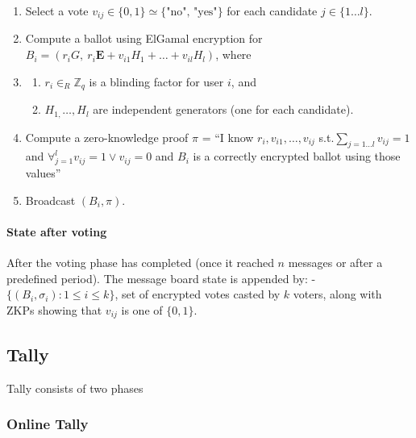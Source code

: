 \documentclass{article}
\begin{document}
\begin{enumerate}
    \item Select a vote $v_{ij} \in \{0,1\} \simeq \{\textrm{"no", "yes"}\}$ for each candidate $j \in \{1 \dots l\}$.
    \item Compute a ballot using ElGamal encryption for $B_i = (r_i G,\ r_i \mathbf{E} + v_{i1} H_1 + \dots + v_{il} H_l)$, where 
    \item \begin{enumerate}
        \item $r_{i} \in_{R} \mathbb{Z}_q$ is a blinding factor for user $i$, and 
        \item $H_{1,}\dots, H_{l}$ are independent generators (one for each candidate).
    \end{enumerate}
    \item Compute a zero-knowledge proof $\pi$ = “I know $r_i, v_{i1},\dots,v_{ij}$ s.t.$\sum_{j= 1 \dots l}v_{ij}=1$ and $\forall_{j=1}^{l}v_{ij}=1 \lor v_{ij}=0$ and $B_i$ is a correctly encrypted ballot using those values”
    \item Broadcast $(B_i,\pi)$.
\end{enumerate}

\paragraph{State after voting}

After the voting phase has completed (once it reached $n$ messages or after a predefined period). The message board state is appended by:
- $\{(B_{i}, \sigma_i) : 1 \leq i \leq k\}$, set of encrypted votes casted by $k$ voters, along with ZKPs showing that $v_{ij}$ is one of $\{0,1\}$.

\subsection{Tally}

Tally consists of two phases
\subsubsection{Online Tally}
\end{document}
